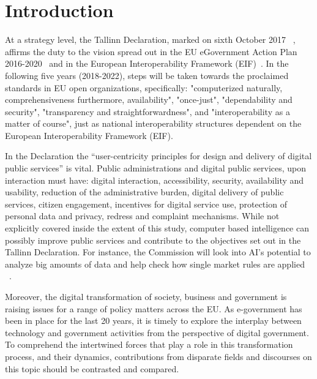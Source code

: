 
\chapter{Introduction}  %

\ifpdf
    \graphicspath{{Chapter1/Figs/Raster/}{Chapter1/Figs/PDF/}{Chapter1/Figs/}}
\else
    \graphicspath{{Chapter1/Figs/Vector/}{Chapter1/Figs/}}
\fi

At a strategy level, the Tallinn Declaration, marked on sixth October 2017
~\citep{tallin_declaration}, affirms the duty to the vision spread out in the EU eGovernment
Action Plan 2016-2020~\citep{action_plan} and in the European Interoperability Framework (EIF)~\citep{eif}. In the following five years (2018-2022), steps will be taken towards
the proclaimed standards in EU open organizations, specifically: "computerized
naturally, comprehensiveness furthermore, availability", "once-just", "dependability
and security", "transparency and straightforwardness", and "interoperability as a
matter of course", just as national interoperability structures dependent on the
European Interoperability Framework (EIF).

In the Declaration the “user-centricity principles for design and delivery of
digital public services” is vital. Public administrations and digital public services,
upon interaction must have: digital interaction, accessibility, security, availability
and usability, reduction of the administrative burden, digital delivery of public services,
citizen engagement, incentives for digital service use, protection of personal data and
privacy, redress and complaint mechanisms. While not explicitly covered inside the extent
of this study, computer based intelligence can possibly improve public services and contribute
to the objectives set out in the Tallinn Declaration. For instance, the Commission will look
into AI's potential to analyze big amounts of data and help check how single market
rules are applied ~\citep{ai_europe}.

Moreover, the digital transformation of society, business and government is raising
issues for a range of policy matters across the EU. As e-government has
been in place for the last 20 years, it is timely to explore the interplay between
technology and government activities from the perspective of digital government.
To comprehend the intertwined forces that play a role in this transformation process,
and their dynamics, contributions from disparate fields and discourses on this topic
should be contrasted and compared.

